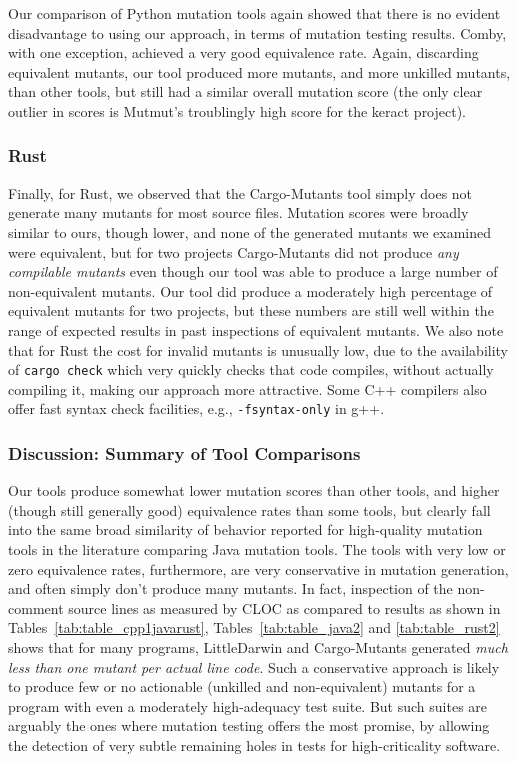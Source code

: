 \documentclass[acmsmall]{acmart}
\begin{document}
{Our comparison of Python mutation tools again showed that there is no
evident disadvantage to
using our approach, in terms of mutation testing results.  Comby, with one
exception, achieved a very good equivalence rate.  Again, discarding
equivalent mutants, our tool produced more mutants, and more unkilled
mutants, than other tools, but still had a similar overall mutation
score (the only clear outlier in scores is Mutmut's troublingly high score for the
keract project). 

\subsubsection{Rust}

Finally, for Rust, we observed that the Cargo-Mutants tool simply does
not generate many mutants for most source files.  Mutation scores were broadly similar to
ours, though lower, and none of the generated mutants we examined were
equivalent, but for two  projects Cargo-Mutants did not produce
\emph{any compilable mutants} even though our tool was able to produce a large
number of non-equivalent mutants.  Our tool did produce a moderately
high 
percentage of equivalent mutants for two  projects, but these numbers are still well
within the range of expected results in past inspections of
equivalent mutants.  We also note  that for Rust the cost for invalid
mutants is unusually low, due to the availability of {\tt cargo check}
which very quickly checks that code compiles, without actually
compiling it, making our approach more attractive.  Some C++ compilers
also offer fast syntax check facilities, e.g., {\tt -fsyntax-only} in g++.

\subsubsection{Discussion: Summary of Tool Comparisons}

Our tools produce somewhat lower mutation scores than other tools, and
higher (though still generally good) equivalence rates than some
tools, but clearly fall into the same broad similarity of behavior
reported for high-quality mutation tools in the literature comparing
Java mutation tools.   The tools with very low or zero equivalence rates, furthermore,
are very conservative in mutation generation, and often simply don't
produce many mutants.  In fact, inspection of the non-comment source
lines as measured by CLOC as compared to results as shown in Tables~\ref{tab:table_cpp1javarust},
Tables~\ref{tab:table_java2} and 
\ref{tab:table_rust2} shows that for many programs, LittleDarwin and
Cargo-Mutants generated \emph{much less than one mutant per actual
  line code}.  Such a conservative approach is likely to produce few
or no actionable (unkilled and non-equivalent) mutants for a program
with even a moderately high-adequacy test suite.  But such suites are
arguably the ones where mutation testing offers the most promise, by
allowing the detection of very subtle remaining holes in tests for
high-criticality software.

}
\end{document}
